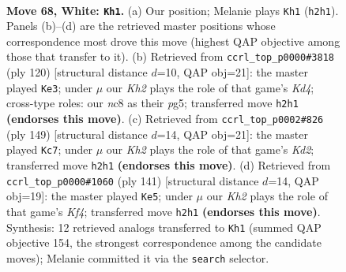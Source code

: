 \documentclass[11pt]{article}
\begin{document}
\clearpage

\begin{figure}[p]\centering
\begin{subfigure}{0.46\textwidth}\centering
\resizebox{\linewidth}{!}{%
\newchessgame
\chessboard[
  setfen={2nk4/8/R7/7p/p5r1/P7/7K/8 w - - 13 68},
  showmover=false,
  pgfstyle=straightmove, color=movearrow, markmove={h2-h1}
]}
\caption{}
\end{subfigure}\hfill
\begin{subfigure}{0.46\textwidth}\centering
\resizebox{\linewidth}{!}{%
\newchessgame
\chessboard[
  setfen={R7/8/p1r5/P4kp1/3K4/8/5P2/8 w - - 0 61},
  showmover=false,
  pgfstyle=straightmove, color=movearrow, markmove={d4-e3}
]}
\caption{}
\end{subfigure}
\\[4pt]
\begin{subfigure}{0.46\textwidth}\centering
\resizebox{\linewidth}{!}{%
\newchessgame
\chessboard[
  setfen={7R/3k4/8/1K4p1/1P6/5r1P/8/8 b - - 0 75},
  showmover=false,
  pgfstyle=straightmove, color=movearrow, markmove={d7-c7}
]}
\caption{}
\end{subfigure}\hfill
\begin{subfigure}{0.46\textwidth}\centering
\resizebox{\linewidth}{!}{%
\newchessgame
\chessboard[
  setfen={8/8/8/5k1p/PR5P/4K3/r7/8 b - - 1 71},
  showmover=false,
  pgfstyle=straightmove, color=movearrow, markmove={f5-e5}
]}
\caption{}
\end{subfigure}
\caption{\textbf{Move 68, White: \texttt{Kh1}.} (a) Our position; Melanie plays \texttt{Kh1} (\texttt{h2h1}). Panels (b)--(d) are the retrieved master positions whose correspondence most drove this move (highest QAP objective among those that transfer to it). (b) Retrieved from \texttt{ccrl\_top\_p0000\#3818} (ply 120) [structural distance $d$=10, QAP obj=21]: the master played \texttt{Ke3}; under $\mu$ our \emph{Kh2} plays the role of that game's \emph{Kd4}; cross-type roles: our \emph{n}c8 as their \emph{p}g5; transferred move \texttt{h2h1} \textbf{(endorses this move)}. (c) Retrieved from \texttt{ccrl\_top\_p0002\#826} (ply 149) [structural distance $d$=14, QAP obj=21]: the master played \texttt{Kc7}; under $\mu$ our \emph{Kh2} plays the role of that game's \emph{Kd2}; transferred move \texttt{h2h1} \textbf{(endorses this move)}. (d) Retrieved from \texttt{ccrl\_top\_p0000\#1060} (ply 141) [structural distance $d$=14, QAP obj=19]: the master played \texttt{Ke5}; under $\mu$ our \emph{Kh2} plays the role of that game's \emph{Kf4}; transferred move \texttt{h2h1} \textbf{(endorses this move)}. Synthesis: 12 retrieved analogs transferred to \texttt{Kh1} (summed QAP objective 154, the strongest correspondence among the candidate moves); Melanie committed it via the \texttt{search} selector.}
\label{fig:thought-m134}
\end{figure}
\end{document}
